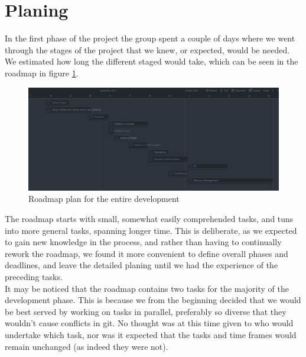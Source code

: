 \section{Planing}
In the first phase of the project the group spent a couple of days where we went through the stages of the project that we knew, or expected, would be needed. We estimated how long the different staged would take, which can be seen in the roadmap in figure \ref{fig:roadmap}.
 
\begin{figure}[h]
\includegraphics[width=\textwidth]{02-Body/Images/Roadmap.png}
\caption{Roadmap plan for the entire development}
\label{fig:roadmap}
\end{figure}

The roadmap starts with small, somewhat easily comprehended tasks, and tuns into more general tasks, spanning longer time. This is deliberate, as we expected to gain new knowledge in the process, and rather than having to continually rework the roadmap, we found it more convenient to define overall phases and deadlines, and leave the detailed planing until we had the experience of the preceding tasks.\\
It may be noticed that the roadmap contains two tasks for the majority of the development phase. This is because we from the beginning decided that we would be best served by working on tasks in parallel, preferably so diverse that they wouldn't cause conflicts in git. No thought was at this time given to who would undertake which task, nor was it expected that the tasks and time frames would remain unchanged (as indeed they were not).

